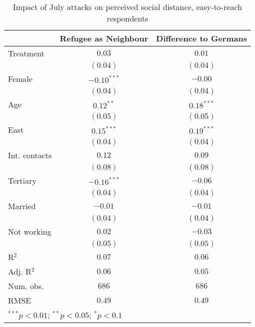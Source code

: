 
\begin{table}
\caption{Impact of July attacks on perceived social distance, easy-to-reach respondents}
\begin{center}
\begin{tabular}{l c c}
\toprule
 & Refugee as Neighbour & Difference to Germans \\
\midrule
Treatment     & $0.03$        & $0.01$       \\
              & $(0.04)$      & $(0.04)$     \\
Female        & $-0.10^{***}$ & $-0.00$      \\
              & $(0.04)$      & $(0.04)$     \\
Age           & $0.12^{**}$   & $0.18^{***}$ \\
              & $(0.05)$      & $(0.05)$     \\
East          & $0.15^{***}$  & $0.19^{***}$ \\
              & $(0.04)$      & $(0.04)$     \\
Int. contacts & $0.12$        & $0.09$       \\
              & $(0.08)$      & $(0.08)$     \\
Tertiary      & $-0.16^{***}$ & $-0.06$      \\
              & $(0.04)$      & $(0.04)$     \\
Married       & $-0.01$       & $-0.01$      \\
              & $(0.04)$      & $(0.04)$     \\
Not working   & $0.02$        & $-0.03$      \\
              & $(0.05)$      & $(0.05)$     \\
\midrule
R$^2$         & $0.07$        & $0.06$       \\
Adj. R$^2$    & $0.06$        & $0.05$       \\
Num. obs.     & $686$         & $686$        \\
RMSE          & $0.49$        & $0.49$       \\
\bottomrule
\multicolumn{3}{l}{\scriptsize{$^{***}p<0.01$; $^{**}p<0.05$; $^{*}p<0.1$}}
\end{tabular}
\label{tab_dist_reach}
\end{center}
\end{table}
